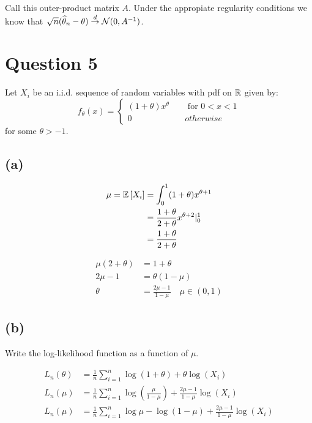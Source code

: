 \documentclass[12pt]{paper}
\begin{document}
Call this outer-product matrix $A$. Under the appropiate regularity
conditions we know that $\sqrt{n}(\widehat{ \theta }_{n} - \theta) \overset{d}{\to} \mathcal{N}( 0,
{A}^{-1})$. 


\section{Question 5}

Let $X_i$ be an i.i.d. sequence of random variables with pdf on
$\mathbb{R}$ given by:
\begin{equation*}
  f_{\theta}(x) =
  \begin{cases}
    (1+\theta)x^{\theta}\quad &\text{ for } 0 < x < 1\\
    0 & otherwise
  \end{cases}
\end{equation*}
for some $\theta > -1$.

\subsection{(a)}

\begin{align*}
  \mu = \mathbb{E} \left [ X_i \right ] &= \int_0^1 (1+\theta)x^{\theta+1}\\
            &= \frac{1+\theta}{2+\theta} x^{\theta+2} \vert_0^1\\
  &= \frac{1+\theta}{2+\theta}  
\end{align*}

\begin{align*}
  \mu(2+\theta) &= 1 + \theta\\
  2\mu - 1 &= \theta( 1 - \mu)\\
  \theta &= \frac{2\mu - 1}{ 1 - \mu} \quad \mu \in (0,1)
\end{align*}

\subsection{(b)}

Write the log-likelihood function as a function of $\mu$.

\begin{align*}
  L_n (\theta) &= \frac{1}{n} \sum_{i=1}^n \log(1 + \theta) + \theta \log( X_i )\\
  L_n( \mu )&= \frac{1}{n} \sum_{i=1}^n \log\left( \frac{\mu}{1-\mu} \right)
            + \frac{2\mu - 1}{ 1 - \mu} \log( X_i )\\
  L_n( \mu )&= \frac{1}{n} \sum_{i=1}^n \log \mu - \log ( 1 - \mu) 
            + \frac{2\mu - 1}{ 1 - \mu} \log( X_i )
\end{align*}
\end{document}
